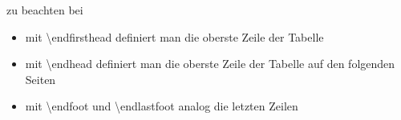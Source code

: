 \begin{frame}[fragile]{zu beachten bei }
\begin{itemize}
\item mit \textbackslash endfirsthead definiert man die oberste Zeile der Tabelle 
\item mit \textbackslash endhead definiert man die oberste Zeile der Tabelle auf den folgenden Seiten
\item mit \textbackslash endfoot und \textbackslash endlastfoot analog die letzten Zeilen
\end{itemize}
\end{frame}

